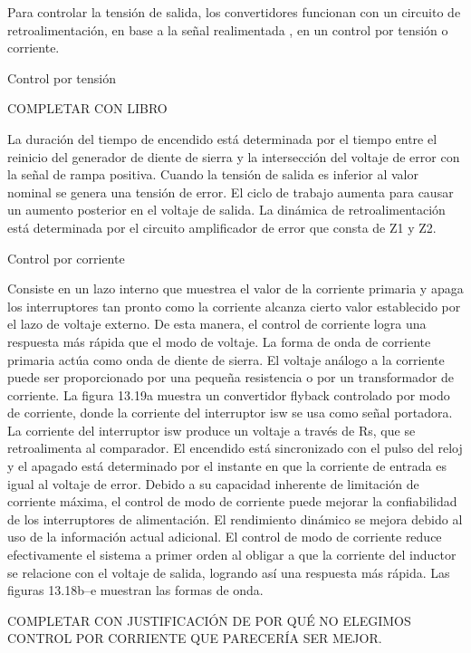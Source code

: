 Para controlar la tensión de salida, los convertidores funcionan con un circuito de retroalimentación,
 en base a la señal realimentada , en un control por tensión o corriente.

Control por tensión

COMPLETAR CON LIBRO

La duración del tiempo de encendido está determinada por el tiempo entre el reinicio del generador de diente de sierra
 y la intersección del voltaje de error con la señal de rampa positiva. 
 Cuando la tensión de salida es inferior al valor nominal se genera una tensión de error. 
 El ciclo de trabajo aumenta para causar un aumento posterior en el voltaje de salida. 
 La dinámica de retroalimentación está determinada por el circuito amplificador de error que consta de Z1 y Z2.



 Control por corriente 

 Consiste en un lazo interno que muestrea el valor de la corriente primaria y apaga los interruptores tan pronto como la corriente alcanza cierto valor establecido por el lazo de voltaje externo. 
 De esta manera, el control de corriente logra una respuesta más rápida que el modo de voltaje. 
 La forma de onda de corriente primaria actúa como onda de diente de sierra. 
 El voltaje análogo a la corriente puede ser proporcionado por una pequeña resistencia o por un transformador de corriente. 
 La figura 13.19a muestra un convertidor flyback controlado por modo de corriente, donde la corriente del interruptor isw se usa como señal portadora. 
 La corriente del interruptor isw produce un voltaje a través de Rs, que se retroalimenta al comparador. 
 El encendido está sincronizado con el pulso del reloj y el apagado está determinado por el instante en que la corriente de entrada es igual al voltaje de error.
 Debido a su capacidad inherente de limitación de corriente máxima, el control de modo de corriente puede mejorar la confiabilidad de los interruptores de alimentación. El rendimiento dinámico se mejora debido al uso de la información actual adicional. El control de modo de corriente reduce efectivamente el sistema a primer orden al obligar a que la corriente del inductor se relacione con el voltaje de salida, logrando así una respuesta más rápida. Las figuras 13.18b–e muestran las formas de onda.

 COMPLETAR CON JUSTIFICACIÓN DE POR QUÉ NO ELEGIMOS CONTROL POR CORRIENTE QUE PARECERÍA SER MEJOR. 


 